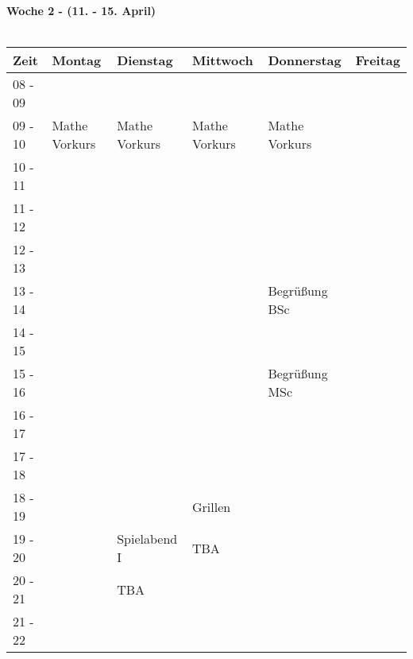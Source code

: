 \pagebreak
\textbf{Woche 2 - (11. - 15. April)}\\
\\
\begin{tabular}{|l|p{}|p{}|p{}|p{}|p{}|} \hline
\hline
Zeit    & Montag & Dienstag & Mittwoch & Donnerstag & Freitag \\ \hline
08 - 09 & & & & & \\ \cline{1-5} %
09 - 10 & \footnotesize{Mathe Vorkurs} & \footnotesize{Mathe Vorkurs} & \footnotesize{Mathe Vorkurs} & \footnotesize{Mathe Vorkurs} & \\ \cline{1-1}
10 - 11 & & & & & \\ \cline{1-1}
11 - 12 & & & & & \\ \cline{1-1} \cline{5-5}
12 - 13 & & & & & \\ \cline{1-1}
13 - 14 & & & & \cellcolor{lightgray} \footnotesize Begrüßung BSc & \\ \cline{1-1}
14 - 15 & & & & \cellcolor{lightgray} & \\ \cline{1-1} \cline{5-5}
15 - 16 & & & & \cellcolor{lightgray} \footnotesize Begrüßung MSc & \\ \cline{1-4}
16 - 17 & & & & \cellcolor{lightgray} & \\ \cline{1-1}
17 - 18 & & & & & \\ \cline{1-1} \cline{4-4}
18 - 19 & & & \cellcolor{lightlightgray} \footnotesize{Grillen} & & \\ \cline{1-1} \cline{3-3}
19 - 20 & & \cellcolor{lightlightgray} \footnotesize{Spielabend I} & \cellcolor{lightlightgray} \scriptsize{TBA} & & \\ \cline{1-1}
20 - 21 & & \cellcolor{lightlightgray} \scriptsize{TBA} & \cellcolor{lightlightgray} & & \\ \cline{1-1}
21 - 22 & & \cellcolor{lightlightgray} & \cellcolor{lightlightgray} & & \\ \hline
\end{tabular}


